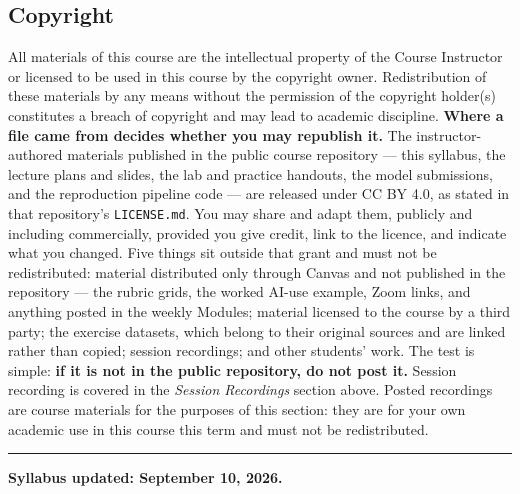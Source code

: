 \documentclass[
]{article}
\begin{document}
\subsection{Copyright}\label{copyright}

All materials of this course are the intellectual property of the Course
Instructor or licensed to be used in this course by the copyright owner.
Redistribution of these materials by any means without the permission of
the copyright holder(s) constitutes a breach of copyright and may lead
to academic discipline. \textbf{Where a file came from decides whether
you may republish it.} The instructor-authored materials published in
the public course repository --- this syllabus, the lecture plans and
slides, the lab and practice handouts, the model submissions, and the
reproduction pipeline code --- are released under CC BY 4.0, as stated
in that repository's \texttt{LICENSE.md}. You may share and adapt them,
publicly and including commercially, provided you give credit, link to
the licence, and indicate what you changed. Five things sit outside that
grant and must not be redistributed: material distributed only through
Canvas and not published in the repository --- the rubric grids, the
worked AI-use example, Zoom links, and anything posted in the weekly
Modules; material licensed to the course by a third party; the exercise
datasets, which belong to their original sources and are linked rather
than copied; session recordings; and other students' work. The test is
simple: \textbf{if it is not in the public repository, do not post it.}
Session recording is covered in the \emph{Session Recordings} section
above. Posted recordings are course materials for the purposes of this
section: they are for your own academic use in this course this term and
must not be redistributed.

\begin{center}\rule{0.5\linewidth}{0.5pt}\end{center}

\textbf{Syllabus updated: September 10, 2026.}
\end{document}
